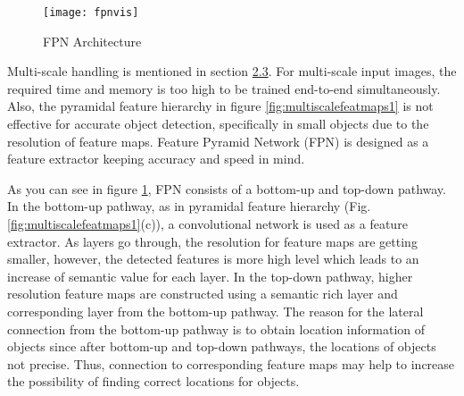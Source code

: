\documentclass{article}
\begin{document}
\setlength{\parindent}{6ex}

\begin{figure}
    \centering
    \texttt{[image: fpnvis]}
    \caption{FPN Architecture \cite{fpncite}}
    \label{fig:fpnvis1}
\end{figure}

\indent

Multi-scale handling is mentioned in section \hyperref[sec:multscale]{2.3}. For multi-scale input images, 
the required time and memory is too high to be trained end-to-end simultaneously. 
Also, the pyramidal feature hierarchy in figure \ref{fig:multiscalefeatmaps1} is not 
effective for accurate object detection, specifically in small objects due to the 
resolution of feature maps. Feature Pyramid Network (FPN) \cite{fpncite} is designed as a 
feature extractor keeping accuracy and speed in mind. \par 

As you can see in figure \ref{fig:fpnvis1}, FPN consists of a bottom-up and 
top-down pathway. In the bottom-up pathway, as in pyramidal feature hierarchy 
(Fig. \ref{fig:multiscalefeatmaps1}(c)), a convolutional network is used as 
a feature extractor. As layers go through, the resolution for feature maps 
are getting smaller, however, the detected features is more high level which 
leads to an increase of semantic value for each layer. In the top-down pathway, 
higher resolution feature maps are constructed using a semantic rich layer and 
corresponding layer from the bottom-up pathway. The reason for the lateral 
connection from the bottom-up pathway is to obtain location information of 
objects since after bottom-up and top-down pathways, the locations of 
objects not precise. Thus, connection to corresponding feature maps 
may help to increase the possibility of finding correct locations for 
objects. 
\end{document}

